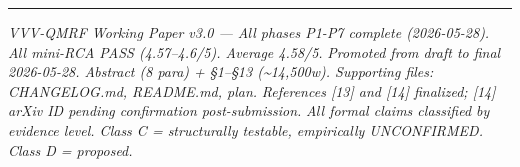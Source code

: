 \documentclass[
  11pt,
]{article}
\begin{document}
\begin{center}\rule{0.5\linewidth}{0.5pt}\end{center}

\emph{VVV-QMRF Working Paper v3.0 --- All phases P1-P7 complete
(2026-05-28). All mini-RCA PASS (4.57--4.6/5). Average 4.58/5.}
\emph{Promoted from draft to final 2026-05-28. Abstract (8 para) +
§1--§13 (\textasciitilde14,500w). Supporting files: CHANGELOG.md,
README.md, plan.} \emph{References {[}13{]} and {[}14{]} finalized;
{[}14{]} arXiv ID pending confirmation post-submission.} \emph{All
formal claims classified by evidence level. Class C = structurally
testable, empirically UNCONFIRMED. Class D = proposed.}
\end{document}
